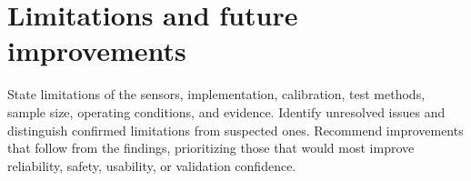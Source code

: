 \chapter{Limitations and future improvements}
\label{sec:limitations}

State limitations of the sensors, implementation, calibration, test methods,
sample size, operating conditions, and evidence. Identify unresolved issues
and distinguish confirmed limitations from suspected ones. Recommend
improvements that follow from the findings, prioritizing those that would
most improve reliability, safety, usability, or validation confidence.
